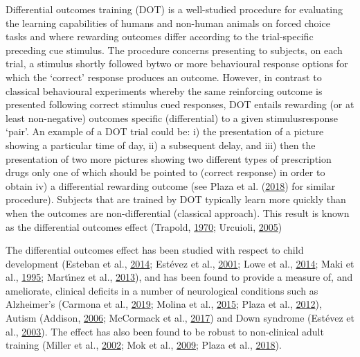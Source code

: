 \documentclass[]{elsarticle} %
\begin{document}
Differential outcomes training (DOT) is a well-studied procedure for
evaluating the learning capabilities of humans and non-human animals on
forced choice tasks and where rewarding outcomes differ according to the
trial-specific preceding cue stimulus. The procedure concerns presenting
to subjects, on each trial, a stimulus shortly followed bytwo or more
behavioural response options for which the `correct' response produces
an outcome. However, in contrast to classical behavioural experiments
whereby the same reinforcing outcome is presented following correct
stimulus cued responses, DOT entails rewarding (or at least
non-negative) outcomes specific (differential) to a given
stimulusresponse `pair'. An example of a DOT trial could be: i) the
presentation of a picture showing a particular time of day, ii) a
subsequent delay, and iii) then the presentation of two more pictures
showing two different types of prescription drugs only one of which
should be pointed to (correct response) in order to obtain iv) a
differential rewarding outcome (see Plaza et al.
(\protect\hyperlink{ref-plaza2018learning}{2018}) for similar
procedure). Subjects that are trained by DOT typically learn more
quickly than when the outcomes are non-differential (classical
approach). This result is known as the differential outcomes effect
(Trapold, \protect\hyperlink{ref-trapold1970expectancies}{1970};
Urcuioli, \protect\hyperlink{ref-urcuioli2005behavioral}{2005})

The differential outcomes effect has been studied with respect to child
development (Esteban et al.,
\protect\hyperlink{ref-esteban2014differential}{2014}; Estévez et al.,
\protect\hyperlink{ref-estevez2001differential}{2001}; Lowe et al.,
\protect\hyperlink{ref-lowe2014neural}{2014}; Maki et al.,
\protect\hyperlink{ref-maki1995expectancies}{1995}; Martı́nez et al.,
\protect\hyperlink{ref-martinez2013effects}{2013}), and has been found
to provide a measure of, and ameliorate, clinical deficits in a number
of neurological conditions such as Alzheimer's (Carmona et al.,
\protect\hyperlink{ref-carmona2019differential}{2019}; Molina et al.,
\protect\hyperlink{ref-molina2015differential}{2015}; Plaza et al.,
\protect\hyperlink{ref-plaza2012improving}{2012}), Autism (Addison,
\protect\hyperlink{ref-addison_examination_2006}{2006}; McCormack et
al., \protect\hyperlink{ref-mccormack2017differential}{2017}) and Down
syndrome (Estévez et al.,
\protect\hyperlink{ref-estevez2003differential}{2003}). The effect has
also been found to be robust to non-clinical adult training (Miller et
al., \protect\hyperlink{ref-miller2002differential}{2002}; Mok et al.,
\protect\hyperlink{ref-mok2009neural}{2009}; Plaza et al.,
\protect\hyperlink{ref-plaza2018learning}{2018}).
\end{document}
